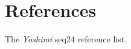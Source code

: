 %
%
%

\section{References}
\label{sec:seq24_references}

   The \textsl{Yoshimi} seq24 reference list.


